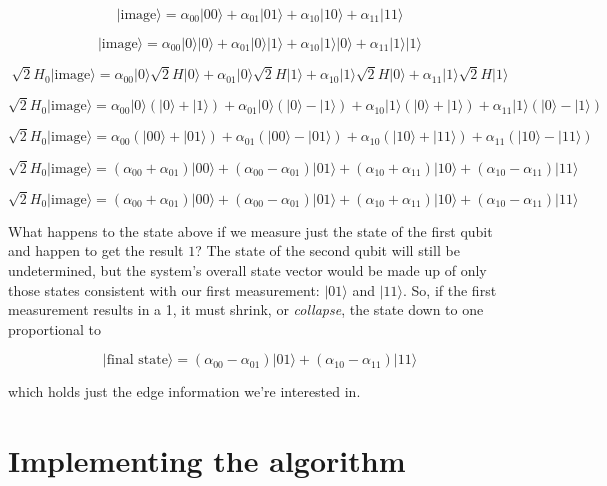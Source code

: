\documentclass[11pt]{article}
\begin{document}
\[ |\textrm{image}\rangle = \alpha_{00}|00\rangle + \alpha_{01}|01\rangle + \alpha_{10}|10\rangle + \alpha_{11}|11\rangle \]

\[ |\textrm{image}\rangle = \alpha_{00}|0\rangle|0\rangle + \alpha_{01}|0\rangle|1\rangle + \alpha_{10}|1\rangle|0\rangle + \alpha_{11}|1\rangle|1\rangle \]

\[ \sqrt{2} H_0 |\textrm{image}\rangle = \alpha_{00}|0\rangle \sqrt{2} H |0\rangle + \alpha_{01}|0\rangle \sqrt{2} H|1\rangle + \alpha_{10}|1\rangle \sqrt{2} H|0\rangle + \alpha_{11}|1\rangle\sqrt{2} H|1\rangle\]

\[ \sqrt{2} H_0 |\textrm{image}\rangle = \alpha_{00}|0\rangle(|0\rangle + |1\rangle) + \alpha_{01}|0\rangle(|0\rangle - |1\rangle) + \alpha_{10}|1\rangle(|0\rangle + |1\rangle) + \alpha_{11}|1\rangle(|0\rangle - |1\rangle)\]

\[ \sqrt{2} H_0 |\textrm{image}\rangle = \alpha_{00}(|00\rangle+|01\rangle) + \alpha_{01}(|00\rangle-|01\rangle) + \alpha_{10}(|10\rangle+|11\rangle) + \alpha_{11}(|10\rangle-|11\rangle) \]

\[ \sqrt{2} H_0 |\textrm{image}\rangle = (\alpha_{00} + \alpha_{01})|00\rangle + (\alpha_{00} - \alpha_{01})|01\rangle + (\alpha_{10} + \alpha_{11})|10\rangle + (\alpha_{10} - \alpha_{11})|11\rangle \]

    \[ \sqrt{2} H_0 |\textrm{image}\rangle = (\alpha_{00} + \alpha_{01})|00\rangle + (\alpha_{00} - \alpha_{01})|01\rangle + (\alpha_{10} + \alpha_{11})|10\rangle + (\alpha_{10} - \alpha_{11})|11\rangle \]

What happens to the state above if we measure just the state of the
first qubit and happen to get the result \(1\)? The state of the second
qubit will still be undetermined, but the system's overall state vector
would be made up of only those states consistent with our first
measurement: \(|01\rangle\) and \(|11\rangle\). So, if the first
measurement results in a 1, it must shrink, or \emph{collapse}, the
state down to one proportional to

\[ |\textrm{final state}\rangle = (\alpha_{00} - \alpha_{01})|01\rangle + (\alpha_{10} - \alpha_{11})|11\rangle \]

which holds just the edge information we're interested in.

    \hypertarget{implementing-the-algorithm}{%
\section{Implementing the
algorithm}\label{implementing-the-algorithm}}
\end{document}
